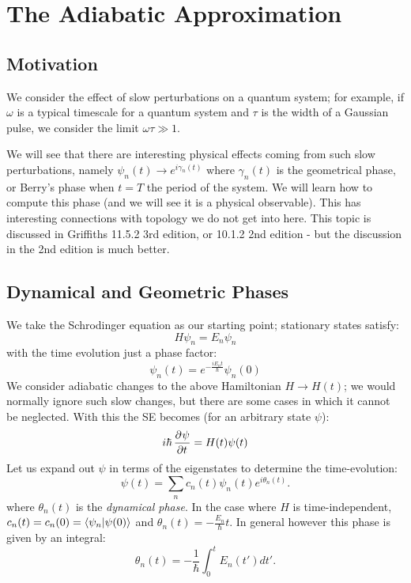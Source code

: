 \section{The Adiabatic Approximation}

\subsection{Motivation}
We consider the effect of slow perturbations on a quantum system; for example, if $\omega$ is a typical timescale for a quantum system and $\tau$ is the width of a Gaussian pulse, we consider the limit $\omega \tau \gg 1$.

We will see that there are interesting physical effects coming from such slow perturbations, namely $\psi_n(t) \to e^{i\gamma_n(t)}$ where $\gamma_n(t)$ is the geometrical phase, or Berry's phase when $t = T$ the period of the system. We will learn how to compute this phase (and we will see it is a physical observable). This has interesting connections with topology we do not get into here. This topic is discussed in Griffiths 11.5.2 3rd edition, or 10.1.2 2nd edition - but the discussion in the 2nd edition is much better.

\subsection{Dynamical and Geometric Phases}
We take the Schrodinger equation as our starting point; stationary states satisfy:
\begin{equation}
    H\psi_n = E_n \psi_n
\end{equation}
with the time evolution just a phase factor:
\begin{equation}
    \psi_n(t) = e^{-\frac{iE_n t}{\hbar}}\psi_n(0)
\end{equation}
We consider adiabatic changes to the above Hamiltonian $H \to H(t)$; we would normally ignore such slow changes, but there are some cases in which it cannot be neglected. With this the SE becomes (for an arbitrary state $\psi$):
\begin{equation}
    i\hbar\dpd{\psi}{t} = H(t)\psi(t)
\end{equation}
Let us expand out $\psi$ in terms of the eigenstates to determine the time-evolution:
\begin{equation}
    \psi(t) = \sum_n c_n(t)\psi_n(t)e^{i\theta_n(t)}.
\end{equation}
where $\theta_n(t)$ is the \emph{dynamical phase}. In the case where $H$ is time-independent, $c_n(t) = c_n(0) = \langle \psi_n \lvert \psi(0) \rangle$ and $\theta_n(t) = -\frac{E_n}{\hbar}t$. In general however this phase is given by an integral:
\begin{equation}
    \theta_n(t) = -\frac{1}{\hbar}\int_0^t E_n(t')dt'.
\end{equation} 

